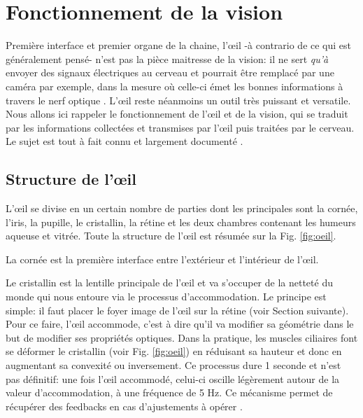 \chapter{Fonctionnement de la vision}
\par Première interface et premier organe de la chaine, l'œil -à contrario de ce qui est généralement pensé- n'est pas la pièce maitresse de la vision: il ne sert \textit{qu'à} envoyer des signaux électriques au cerveau et pourrait être remplacé par une caméra par exemple, dans la mesure où celle-ci émet les bonnes informations à travers le nerf optique \citep{dobelle_artificial_2000}. L'œil reste néanmoins un outil très puissant et versatile. Nous allons ici rappeler le fonctionnement de l'œil et de la vision, qui se traduit par les informations collectées et transmises par l'œil puis traitées par le cerveau. Le sujet est tout à fait connu et largement documenté \citep{fairchild_human_2005,wandell_foundations_1995,gross_human_2008,driscoll_eyes_1978}.

	\section{Structure de l'œil}
	\par L'œil se divise en un certain nombre de parties dont les principales sont la cornée, l'iris, la pupille, le cristallin, la rétine et les deux chambres contenant les humeurs aqueuse et vitrée. Toute la structure de l'œil est résumée sur la Fig. \ref{fig:oeil}.
	
	\par La cornée est la première interface entre l'extérieur et l'intérieur de l'œil.
	
	\par Le cristallin est la lentille principale de l'œil et va s'occuper de la netteté du monde qui nous entoure via le processus d'accommodation. Le principe est simple: il faut placer le foyer image de l'œil sur la rétine (voir Section suivante). Pour ce faire, l'œil accommode, c'est à dire qu'il va modifier sa géométrie dans le but de modifier ses propriétés optiques. Dans la pratique, les muscles ciliaires font se déformer le cristallin (voir Fig. \ref{fig:oeil}) en réduisant sa hauteur et donc en augmentant sa convexité ou inversement. Ce processus dure 1 seconde et n'est pas définitif: une fois l'œil accommodé, celui-ci oscille légèrement autour de la valeur  d'accommodation, à une fréquence de 5 Hz. Ce mécanisme permet de récupérer des feedbacks en cas d'ajustements à opérer \citep{gross_human_2008}.
	
